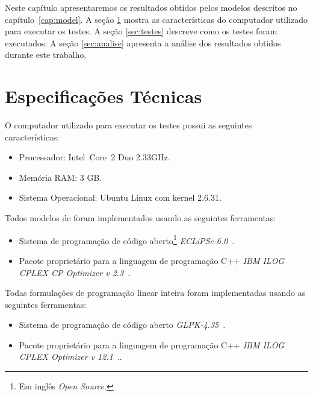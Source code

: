 Neste capítulo apresentaremos os resultados obtidos pelos modelos
descritos no capítulo~\ref{cap:model}. A seção \ref{sec:tspec} mostra
as características do computador utilizado para executar os testes. A
seção \ref{sec:testes} descreve como os testes foram executados. A
seção \ref{sec:analise} apresenta a análise dos resultados obtidos
durante este trabalho.

\section{Especificações Técnicas}
\label{sec:tspec}
O computador utilizado para executar os testes possui as seguintes
características:

\begin{itemize}
  \item{Processador: Intel\textregistered{}~Core\texttrademark~2 Duo
  2.33GHz.}

  \item{Memória RAM: 3 GB.}
  
  \item{Sistema Operacional: Ubuntu Linux com kernel 2.6.31.}
\end{itemize}

Todos modelos de \pr{} foram implementados usando as seguintes
ferramentas:

\begin{itemize}
  \item{Sistema de programação de código aberto\footnote{Em
  inglês \textit{Open
  Source}.} \textit{ECLiPSe-6.0}~\cite{eclipse*2009}. }
  
 \item{Pacote proprietário para a linguagem de programação
  C++ \textit{IBM\textregistered{} ILOG\textregistered{}
  CPLEX\textregistered{} CP Optimizer v 2.3}~\cite{ilogcp*2011}.}
\end{itemize}

Todas formulações de programação linear inteira foram implementadas
usando as seguintes ferramentas:

\begin{itemize}
  \item{Sistema de programação de código
  aberto \textit{GLPK-4.35}~\cite{glpk*2010}.}
  
  \item{Pacote proprietário para a linguagem de programação
  C++ \textit{IBM\textregistered{} ILOG\textregistered{}
  CPLEX\textregistered{} Optimizer v 12.1}~\cite{ilogcplex*2011}..}
\end{itemize}

